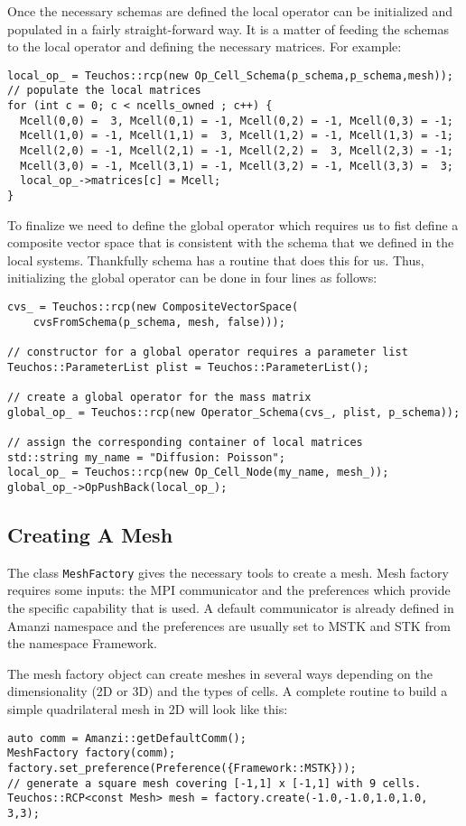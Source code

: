 Once the necessary schemas are defined the local operator can be initialized and populated in a fairly straight-forward way. 
It is a matter of feeding the schemas to the local operator and defining the necessary matrices. For example:
%
\begin{lstlisting}
local_op_ = Teuchos::rcp(new Op_Cell_Schema(p_schema,p_schema,mesh));
// populate the local matrices
for (int c = 0; c < ncells_owned ; c++) {
  Mcell(0,0) =  3, Mcell(0,1) = -1, Mcell(0,2) = -1, Mcell(0,3) = -1;
  Mcell(1,0) = -1, Mcell(1,1) =  3, Mcell(1,2) = -1, Mcell(1,3) = -1;
  Mcell(2,0) = -1, Mcell(2,1) = -1, Mcell(2,2) =  3, Mcell(2,3) = -1;
  Mcell(3,0) = -1, Mcell(3,1) = -1, Mcell(3,2) = -1, Mcell(3,3) =  3;
  local_op_->matrices[c] = Mcell;
}
\end{lstlisting}
%
To finalize we need to define the global operator which requires us to fist define a composite vector space that is consistent with the schema that we defined in the local systems. Thankfully schema has a routine that does this for us. Thus, initializing the global operator can be done in four lines as follows:
\begin{lstlisting}
cvs_ = Teuchos::rcp(new CompositeVectorSpace(
    cvsFromSchema(p_schema, mesh, false)));

// constructor for a global operator requires a parameter list
Teuchos::ParameterList plist = Teuchos::ParameterList();

// create a global operator for the mass matrix
global_op_ = Teuchos::rcp(new Operator_Schema(cvs_, plist, p_schema));

// assign the corresponding container of local matrices
std::string my_name = "Diffusion: Poisson";
local_op_ = Teuchos::rcp(new Op_Cell_Node(my_name, mesh_));
global_op_->OpPushBack(local_op_);
\end{lstlisting}


\subsection{Creating A Mesh}\label{CreatingAMesh}
The class {\tt MeshFactory} gives the necessary tools to create a mesh. 
Mesh factory requires some inputs: the MPI communicator and the preferences which provide the specific capability that is used. 
A default communicator is already defined in Amanzi namespace and the preferences are usually set 
to MSTK and STK from the namespace Framework.

The mesh factory object can create meshes in several ways depending on the dimensionality (2D or 3D) and the types of cells. 
A complete routine to build a simple quadrilateral mesh in 2D will look like this: 
%
\begin{lstlisting}
auto comm = Amanzi::getDefaultComm();
MeshFactory factory(comm);
factory.set_preference(Preference({Framework::MSTK}));
// generate a square mesh covering [-1,1] x [-1,1] with 9 cells.
Teuchos::RCP<const Mesh> mesh = factory.create(-1.0,-1.0,1.0,1.0, 3,3);
\end{lstlisting}


